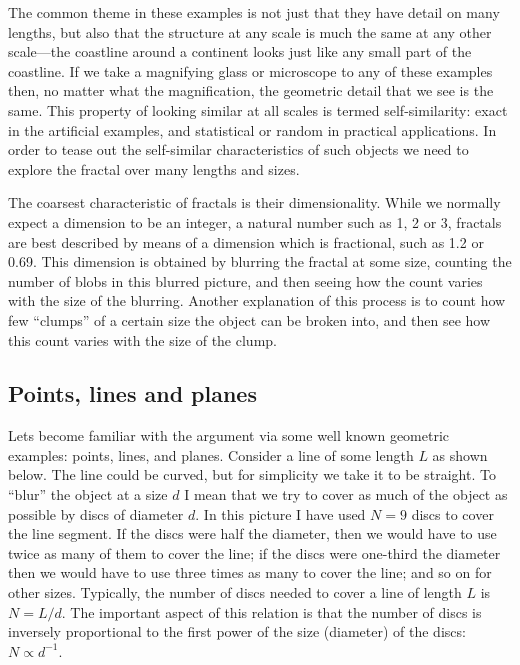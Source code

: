 \documentclass[12pt,a5paper]{article}
\begin{document}
The common theme in these examples is not just that they have detail 
on many lengths, but also that the structure at any scale is much the 
same at any other scale---the coastline around a continent looks just 
like any small part of the coastline.  If we take a magnifying glass 
or microscope to any of these examples then, no matter what the 
magnification, the geometric detail that we see is the same.  This 
property of looking similar at all scales is termed self-similarity: 
exact in the artificial examples, and statistical or random in 
practical applications.  In order to tease out the self-similar 
characteristics of such objects we need to explore the fractal over 
many lengths and sizes.  

The coarsest characteristic of fractals is their dimensionality.  
While we normally expect a dimension to be an integer, a natural 
number such as 1, 2 or 3, fractals are best described by means of a 
dimension which is fractional, such as 1.2 or 0.69.  This dimension 
is obtained by blurring the fractal at some size, counting the number 
of blobs in this blurred picture, and then seeing how the count 
varies with the size of the blurring.  Another explanation of this 
process is to count how few ``clumps'' of a certain size the object can 
be broken into, and then see how this count varies with the size of 
the clump.  

\subsection{Points, lines and planes}

Lets become familiar with the argument via some well known geometric 
examples: points, lines, and planes.  Consider a line of some length 
$L$ as shown below.  The line could be curved, but for simplicity 
we take it to be straight.  To ``blur'' the object at a size
\(
	d
\)
 I mean that we try to cover as much of 
the object as possible by discs of diameter $d$.  In this picture I 
have used 
\(
	N=9
\)
 discs to cover the line segment.  If the discs were 
half the diameter, then we would have to use twice as many of them to 
cover the line;  if the discs were one-third the diameter then we 
would have to use three times as many to cover the line;  and so on 
for other sizes.  Typically, the number of discs needed to cover a 
line of length $L$ is $N=L/d$.  The important aspect of this relation is 
that the number of discs is inversely proportional to the first power 
of the size (diameter) of the discs: $N\propto d^{-1}$.  
\end{document}
